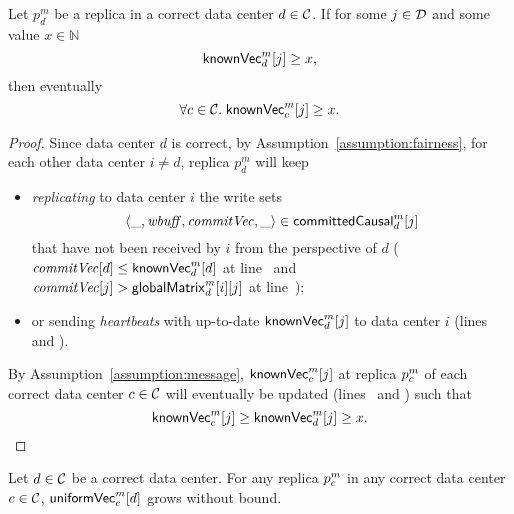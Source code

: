 \begin{applemma} \label{lemma:knownvc-x}
  Let $p^{m}_{d}$ be a replica in a correct data center $d \in \mathcal{C}$.
  If for some $j \in \mathcal{D}$ and some value $x \in \mathbb{N}$
  \[
    {\sf knownVec}^{m}_{d}[j] \ge x,
  \]
  then eventually
  \[
    \forall c \in \mathcal{C}.\; {\sf knownVec}^{m}_{c}[j] \ge x.
  \]
\end{applemma}

\begin{proof} \label{proof:knownvc-x}
  Since data center $d$ is correct, by Assumption~\ref{assumption:fairness},
  for each other data center $i \neq d$, replica $p^{m}_{d}$ will keep
  \begin{itemize}
    \item \emph{replicating} to data center $i$ the write sets
      \[
        \langle \_, \mathit{wbuff}, \mathit{commitVec}, \_ \rangle \in {\sf committedCausal}^{m}_{d}[j]
      \]
      that have not been received by $i$ from the perspective of $d$
      ($\mathit{commitVec}[d] \le {\sf knownVec}^{m}_{d}[d]$
      at line~\code{\ref{alg:unistore-replication}}{\ref{line:propagate-txs}}
      and $\mathit{commitVec}[j] > {\sf globalMatrix}^{m}_{d}[i][j]$ at
      line~\code{\ref{alg:unistore-replication}}{\ref{line:forward-txs}});
    \item or sending \emph{heartbeats} with up-to-date
      ${\sf knownVec}^{m}_{d}[j]$ to data center $i$
      (lines~\code{\ref{alg:unistore-replication}}{\ref{line:propagate-call-heartbeat}}
      and \code{\ref{alg:unistore-replication}}{\ref{line:forward-call-heartbeat}}).
  \end{itemize}
  By Assumption~\ref{assumption:message},
  ${\sf knownVec}^{m}_{c}[j]$ at replica $p^{m}_{c}$ of
  each correct data center $c \in \mathcal{C}$ will eventually be updated
  (lines~\code{\ref{alg:unistore-replication}}{\ref{line:replicate-knownvc}}
  and \code{\ref{alg:unistore-replication}}{\ref{line:heartbeat-knownvc}})
  such that
  \[
    {\sf knownVec}^{m}_{c}[j] \ge {\sf knownVec}^{m}_{d}[j] \ge x.
  \]
\end{proof}

\begin{applemma} \label{lemma:uniformvc-c-no-bound}
  Let $d \in \mathcal{C}$ be a correct data center.
  For any replica $p^{m}_{c}$
  in any correct data center $c \in \mathcal{C}$,
  ${\sf uniformVec}^{m}_{c}[d]$ grows without bound.
\end{applemma}

